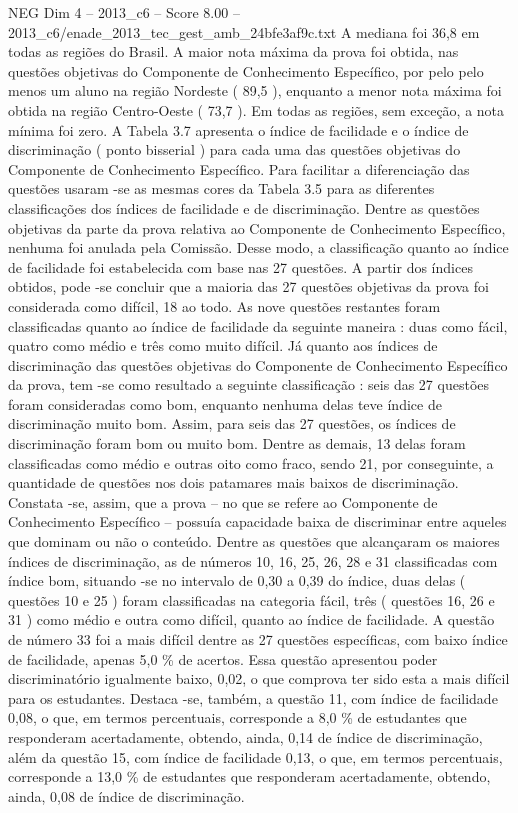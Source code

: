 \begin{textsample}{NEG Dim 4 – 2013\_c6 – Score 8.00 – 2013\_c6/enade\_2013\_tec\_gest\_amb\_24bfe3af9c.txt}
A mediana foi 36,8 em todas as regiões do Brasil.
A maior nota máxima da prova foi obtida, nas questões objetivas do Componente de Conhecimento Específico, por pelo pelo menos um aluno na região Nordeste ( 89,5 ), enquanto a menor nota máxima foi obtida na região Centro-Oeste ( 73,7 ).
Em todas as regiões, sem exceção, a nota mínima foi zero.
A Tabela 3.7 apresenta o índice de facilidade e o índice de discriminação ( ponto bisserial ) para cada uma das questões objetivas do Componente de Conhecimento Específico.
Para facilitar a diferenciação das questões usaram -se as mesmas cores da Tabela 3.5 para as diferentes classificações dos índices de facilidade e de discriminação.
Dentre as questões objetivas da parte da prova relativa ao Componente de Conhecimento Específico, nenhuma foi anulada pela Comissão.
Desse modo, a classificação quanto ao índice de facilidade foi estabelecida com base nas 27 questões.
A partir dos índices obtidos, pode -se concluir que a maioria das 27 questões objetivas da prova foi considerada como difícil, 18 ao todo.
As nove questões restantes foram classificadas quanto ao índice de facilidade da seguinte maneira : duas como fácil, quatro como médio e três como muito difícil.
Já quanto aos índices de discriminação das questões objetivas do Componente de Conhecimento Específico da prova, tem -se como resultado a seguinte classificação : seis das 27 questões foram consideradas como bom, enquanto nenhuma delas teve índice de discriminação muito bom.
Assim, para seis das 27 questões, os índices de discriminação foram bom ou muito bom.
Dentre as demais, 13 delas foram classificadas como médio e outras oito como fraco, sendo 21, por conseguinte, a quantidade de questões nos dois patamares mais baixos de discriminação.
Constata -se, assim, que a prova – no que se refere ao Componente de Conhecimento Específico – possuía capacidade baixa de discriminar entre aqueles que dominam ou não o conteúdo.
Dentre as questões que alcançaram os maiores índices de discriminação, as de números 10, 16, 25, 26, 28 e 31 classificadas com índice bom, situando -se no intervalo de 0,30 a 0,39 do índice, duas delas ( questões 10 e 25 ) foram classificadas na categoria fácil, três ( questões 16, 26 e 31 ) como médio e outra como difícil, quanto ao índice de facilidade.
A questão de número 33 foi a mais difícil dentre as 27 questões específicas, com baixo índice de facilidade, apenas 5,0 \% de acertos.
Essa questão apresentou poder discriminatório igualmente baixo, 0,02, o que comprova ter sido esta a mais difícil para os estudantes.
Destaca -se, também, a questão 11, com índice de facilidade 0,08, o que, em termos percentuais, corresponde a 8,0 \% de estudantes que responderam acertadamente, obtendo, ainda, 0,14 de índice de discriminação, além da questão 15, com índice de facilidade 0,13, o que, em termos percentuais, corresponde a 13,0 \% de estudantes que responderam acertadamente, obtendo, ainda, 0,08 de índice de discriminação.

\end{textsample}

